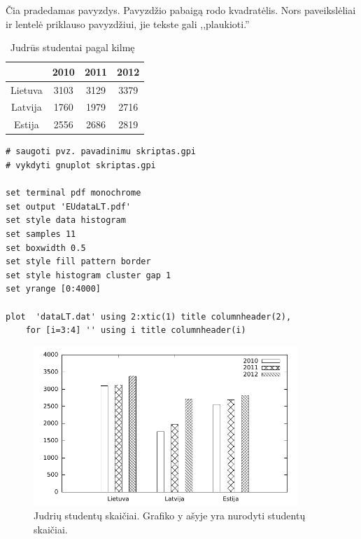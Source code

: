 \documentclass[a4paper,12pt]{article}
\begin{document}
\begin{example}\label{ex:one}
Čia pradedamas pavyzdys. Pavyzdžio pabaigą rodo kvadratėlis. Nors paveikslėliai ir lentelė priklauso pavyzdžiui, jie tekste gali ,,plaukioti.''

\begin{table}[htbp]\caption{Judrūs studentai pagal kilmę~\cite{Eurostat}}
\label{tabl:EUdata}\centering
\begin{tabular}{cccc}
&2010&2011&2012\\\hline
Lietuva&3103 &3129& 3379\\
Latvija&1760&1979&2716\\
Estija&2556&2686&2819\\
\end{tabular}
\end{table}


\begin{lstlisting}[language=Gnuplot,caption={Gnuplot kodo pavyzdys},label={code:sec},emph={0},float=tb,commentstyle=\color{black},xleftmargin=0.1\textwidth]
# saugoti pvz. pavadinimu skriptas.gpi
# vykdyti gnuplot skriptas.gpi

set terminal pdf monochrome
set output 'EUdataLT.pdf'
set style data histogram 
set samples 11
set boxwidth 0.5 
set style fill pattern border
set style histogram cluster gap 1
set yrange [0:4000]

plot  'dataLT.dat' using 2:xtic(1) title columnheader(2), 
    for [i=3:4] '' using i title columnheader(i)
\end{lstlisting}


\begin{figure}[!htbp]\begin{center}
\includegraphics[width=10cm]{figures/EUdataLT}
\end{center}
\caption{Judrių studentų skaičiai. Grafiko y ašyje yra nurodyti studentų skaičiai.}
\label{fig:EUplot}
\end{figure}



\QED
\end{example}
\end{document}

